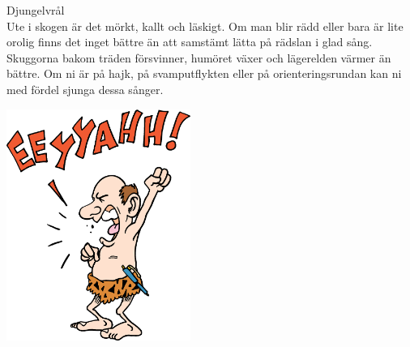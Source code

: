 \begin{flushleft}
{\Huge Djungelvrål\\}
{\Large
\vspace{1cm}
Ute i skogen är det mörkt, kallt och läskigt. Om man blir rädd eller
bara är lite orolig finns det inget bättre än att samstämt lätta på
rädslan i glad sång. Skuggorna bakom träden försvinner, humöret växer
och lägerelden värmer än bättre. Om ni är på hajk, på svamputflykten eller på
orienteringsrundan kan ni med fördel sjunga dessa sånger.}
   
\end{flushleft}
\vspace{2cm}
\begin{center}
\includegraphics[width=6cm]{bilder/120.eps}

\end{center}
 

\newpage
{}


\newpage


\newpage





\newpage













